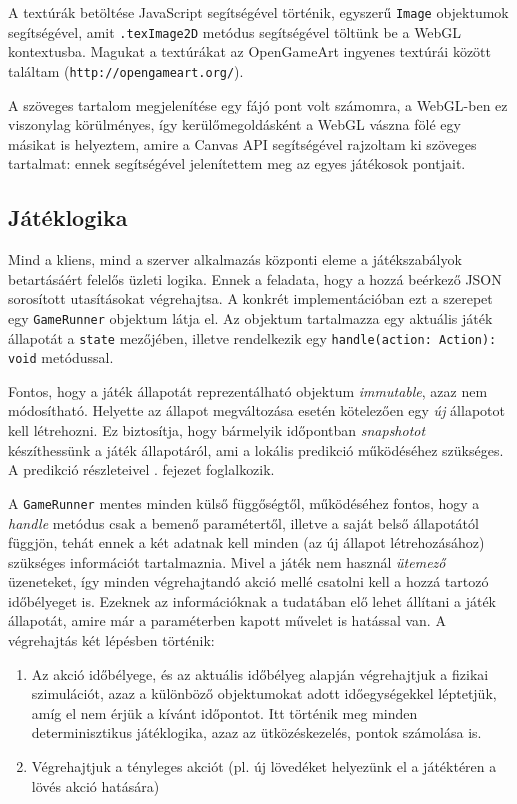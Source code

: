 A textúrák betöltése JavaScript segítségével történik, egyszerű \texttt{Image}
objektumok segítségével, amit \texttt{.texImage2D} metódus segítségével töltünk
be a WebGL kontextusba. Magukat a textúrákat az OpenGameArt ingyenes textúrái
között találtam (\texttt{http://opengameart.org/}).

A szöveges tartalom megjelenítése egy fájó pont volt számomra, a WebGL-ben ez
viszonylag körülményes, így kerülőmegoldásként a WebGL vászna fölé egy másikat
is helyeztem, amire a Canvas API segítségével rajzoltam ki szöveges tartalmat:
ennek segítségével jelenítettem meg az egyes játékosok pontjait.


\subsection{Játéklogika}

Mind a kliens, mind a szerver alkalmazás központi eleme a játékszabályok
betartásáért felelős üzleti logika. Ennek a feladata, hogy a hozzá beérkező JSON
sorosított utasításokat végrehajtsa. A konkrét implementációban ezt a szerepet
egy \texttt{GameRunner} objektum látja el. Az objektum tartalmazza egy aktuális
játék állapotát a \texttt{state} mezőjében, illetve rendelkezik egy
\texttt{handle(action: Action): void} metódussal.

Fontos, hogy a játék állapotát reprezentálható objektum \emph{immutable}, azaz
nem módosítható. Helyette az állapot megváltozása esetén kötelezően egy
\emph{új} állapotot kell létrehozni.  Ez biztosítja, hogy bármelyik időpontban
\emph{snapshotot} készíthessünk a játék állapotáról, ami a lokális predikció
működéséhez szükséges. A predikció részleteivel . fejezet
foglalkozik.

A \texttt{GameRunner} mentes minden külső függőségtől, működéséhez fontos, hogy
a \emph{handle} metódus csak a bemenő paramétertől, illetve a saját belső
állapotától függjön, tehát ennek a két adatnak kell minden (az új állapot
létrehozásához) szükséges információt tartalmaznia. Mivel a játék nem használ
\emph{ütemező} üzeneteket, így minden végrehajtandó akció mellé csatolni kell a
hozzá tartozó időbélyeget is. Ezeknek az információknak a tudatában elő lehet
állítani a játék állapotát, amire már a paraméterben kapott művelet is hatással
van. A végrehajtás két lépésben történik:

\begin{enumerate}
  \item Az akció időbélyege, és az aktuális időbélyeg alapján végrehajtjuk a
    fizikai szimulációt, azaz a különböző objektumokat adott időegységekkel
    léptetjük, amíg el nem érjük a kívánt időpontot. Itt történik meg minden
    determinisztikus játéklogika, azaz az ütközéskezelés, pontok számolása is.
  \item Végrehajtjuk a tényleges akciót (pl. új lövedéket helyezünk el a
    játéktéren a lövés akció hatására)
\end{enumerate}

